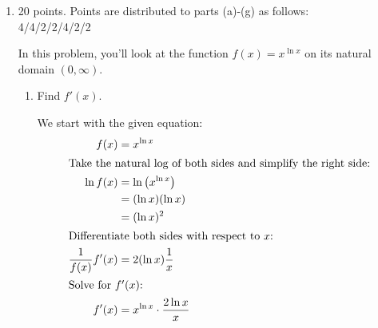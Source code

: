 \documentclass{article}
\begin{document}
\begin{enumerate}[topsep=0pt]
  \begin{solution}
    As usual, we should start by giving a name to the thing we're trying
    to differentiate using logarithmic differentiation; let's call it
    $h(x)$: 
    \begin{align*}
      h(x) &= f(x)^{g(x)} \\
      \intertext{Take $\ln$ of both sides:}
      \ln h(x) &= \ln \left( f(x)^{g(x)} \right) \\
      &= g(x) \ln f(x) \\
      \intertext{Differentiate both sides:}
      \frac{h'(x)}{h(x)} &= g(x) \frac{f'(x)}{f(x)} + g'(x) \ln f(x) \\
      \intertext{Solve for $h'(x)$:}
      h'(x) &= h(x) \left[ g(x) \frac{f'(x)}{f(x)} + g'(x) \ln f(x)
      \right] \\
      &= f(x)^{g(x)} \left[ g(x) \frac{f'(x)}{f(x)} + g'(x) \ln f(x)
      \right] 
    \end{align*}
  \end{solution}


\pspace{\newpage}

\item 

\begin{grading}
 20 points. Points are distributed to parts (a)-(g) as follows:\\
 4/4/2/2/4/2/2
\end{grading}

In this problem, you'll look at the function $f(x) = x^{\ln x}$ on
  its natural domain $(0, \infty)$.
  \begin{enumerate}
  \item
    \begin{problem}[\stretch{1}]
      Find $f'(x)$.
    \end{problem}

    \begin{solution}
        We start with the given equation:
      \begin{align*}
        f(x) &= x^{\ln x} \\
        \intertext{Take the natural log of both sides and simplify the
          right side:}
        \ln f(x) &= \ln \left( x^{\ln x} \right) \\
        &= (\ln x)(\ln x) \\
        &= (\ln x)^2 \\
        \intertext{Differentiate both sides with respect to $x$:}
        \frac{1}{f(x)} f'(x) &= 2 (\ln x) \frac{1}{x} \\
        \shortintertext{Solve for $f'(x)$:}
        f'(x) &= x^{\ln x} \cdot \frac{2 \ln x}{x} 
      \end{align*}
    \end{solution}


\end{enumerate}
\end{enumerate}
\end{document}
